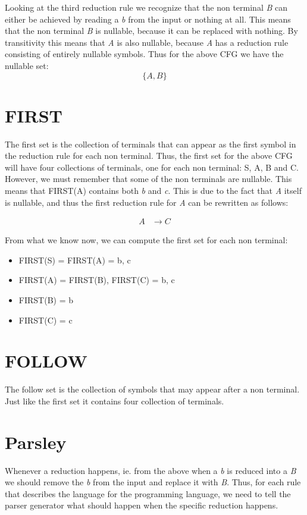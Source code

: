 Looking at the third reduction rule we recognize that the non terminal \textit{B} can either be achieved by reading a \textit{b} from the input or nothing at all. This means that the non terminal \textit{B} is nullable, because it can be replaced with nothing. By transitivity this means that \textit{A} is also nullable, because \textit{A} has a reduction rule consisting of entirely nullable symbols. Thus for the above CFG we have the nullable set:
\[\{A, B\}\]

\section*{FIRST}

The first set is the collection of terminals that can appear as the first symbol in the reduction rule for each non terminal. Thus, the first set for the above CFG will have four collections of terminals, one for each non terminal: S, A, B and C. However, we must remember that some of the non terminals are nullable. This means that FIRST(A) contains both \textit{b} and \textit{c}. This is due to the fact that \textit{A} itself is nullable, and thus the first reduction rule for \textit{A} can be rewritten as follows:


\begin{equation*}
  \begin{split}
      A &\rightarrow C
  \end{split}
\end{equation*}

From what we know now, we can compute the first set for each non terminal:
\begin{itemize}
  \item FIRST(S) = {FIRST(A)} = {b, c}
  \item FIRST(A) = {FIRST(B), FIRST(C)} = {b, c}
  \item FIRST(B) = {b}
  \item FIRST(C) = {c}
\end{itemize}

\section*{FOLLOW}

The follow set is the collection of symbols that may appear after a non terminal. Just like the first set it contains four collection of terminals.

\section*{Parsley}

Whenever a reduction happens, ie. from the above when a \textit{b} is reduced into a \textit{B} we should remove the \textit{b} from the input and replace it with \textit{B}. Thus, for each rule that describes the language for the programming language, we need to tell the parser generator what should happen when the specific reduction happens.  
